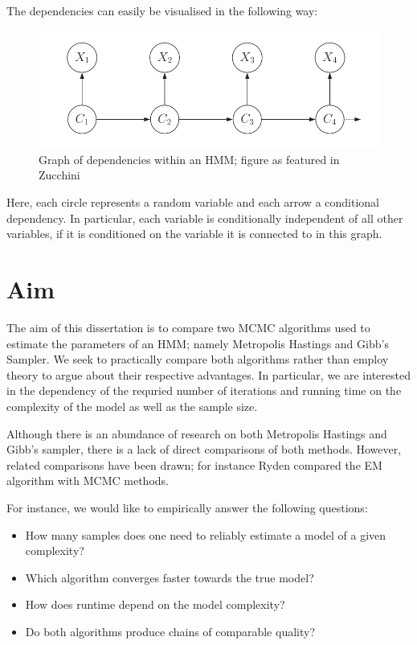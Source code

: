 The dependencies can easily be visualised in the following way:
\begin{figure}[H]
\includegraphics[width=0.8\linewidth]{img/hmm_dependencies.png}
\caption{Graph of dependencies within an HMM; figure as featured in Zucchini \cite{zucchini}}
\end{figure}
Here, each circle represents a random variable and each arrow a conditional dependency. In particular, each variable is conditionally independent of all other variables, if it is conditioned on the variable it is connected to in this graph. 


\section{Aim}
The aim of this dissertation is to compare two MCMC algorithms used to estimate the parameters of an HMM; namely Metropolis Hastings and Gibb's Sampler. We seek to practically compare both algorithms rather than employ theory to argue about their respective advantages. In particular, we are interested in the dependency of the requried number of iterations and running time on the complexity of the model as well as the sample size. 

Although there is an abundance of research on both Metropolis Hastings and Gibb's sampler, there is a lack of direct comparisons of both methods. However, related comparisons have been drawn; for instance Ryden\cite{ryden} compared the EM algorithm with MCMC methods. 

For instance, we would like to empirically answer the following questions:
\begin{itemize}
	\item How many samples does one need to reliably estimate a model of a given complexity?
	\item Which algorithm converges faster towards the true model?
	\item How does runtime depend on the model complexity?
	\item Do both algorithms produce chains of comparable quality?
\end{itemize}

